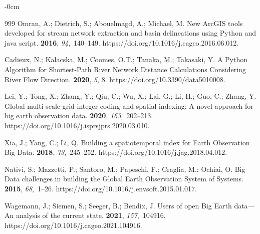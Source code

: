 \documentclass[data,article,accept,pdftex,moreauthors]{Definitions/mdpi}
\begin{document}
{\begin{adjustwidth}{-\extralength}{0cm}
\begin{thebibliography}{999}
Omran, A.; Dietrich, S.; Abouelmagd, A.; Michael, M.
\newblock New ArcGIS tools developed for stream network extraction and basin
 delineations using Python and java script.
 {\bf 2016}, {\em 94},~140--149.
https://doi.org/10.1016/j.cageo.2016.06.012.

Cadieux, N.; Kalacska, M.; Coomes, O.T.; Tanaka, M.; Takasaki, Y.
\newblock A Python Algorithm for Shortest-Path River Network Distance
 Calculations Considering River Flow Direction.
 {\bf 2020}, {\em 5}, 8.
https://doi.org/10.3390/data5010008.

Lei, Y.; Tong, X.; Zhang, Y.; Qiu, C.; Wu, X.; Lai, G.; Li, H.; Guo, C.; Zhang,
 Y.
\newblock Global multi-scale grid integer coding and spatial indexing: A novel
 approach for big earth observation data.
 {\bf 2020},
 {\em 163},~202--213.
https://doi.org/10.1016/j.isprsjprs.2020.03.010.

Xia, J.; Yang, C.; Li, Q.
\newblock Building a spatiotemporal index for Earth Observation Big Data.
 {\bf 2018}, {\em 73},~245--252.
https://doi.org/10.1016/j.jag.2018.04.012.

Nativi, S.; Mazzetti, P.; Santoro, M.; Papeschi, F.; Craglia, M.; Ochiai, O.
\newblock Big Data challenges in building the Global Earth Observation System
 of Systems.
 {\bf 2015}, {\em
 68},~1--26.
https://doi.org/10.1016/j.envsoft.2015.01.017.

Wagemann, J.; Siemen, S.; Seeger, B.; Bendix, J.
\newblock Users of open Big Earth data---An analysis of the current state.
 {\bf 2021}, {\em 157},~104916.
https://doi.org/10.1016/j.cageo.2021.104916.



\end{thebibliography}
\end{adjustwidth}}
\end{document}
